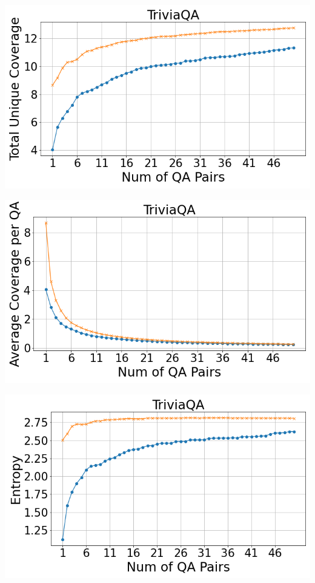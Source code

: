 \documentclass[11pt]{article}
\begin{document}
\noindent
\begin{minipage}{0.33\textwidth}
    \includegraphics[width=\linewidth]{submissions/Tung2023/figs/TriviaQA_Total Unique Coverage.png}
    \label{fig:triviaqa-total-unique-coverage}
\end{minipage}%
\begin{minipage}{0.33\textwidth}
    \includegraphics[width=\linewidth]{submissions/Tung2023/figs/TriviaQA_Average Coverage per QA.png}
    \label{fig:triviaqa-avg-cov-per-qa}
\end{minipage}%
\begin{minipage}{0.33\textwidth}
    \includegraphics[width=\linewidth]{submissions/Tung2023/figs/TriviaQA_Entropy.png}
    \label{fig:triviaqa-entropy}
\end{minipage}
\end{document}
